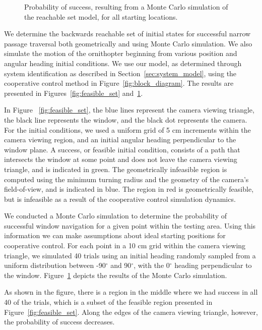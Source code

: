 \documentclass{aamas2013}
\begin{document}
\begin{figure}[tb]
\begin{minipage}[t]{0.47\linewidth}
\caption{Probability of success, resulting from a Monte Carlo simulation of
the reachable set model, for all starting locations.}
\label{fig:heat_map}
\end{minipage}
\end{figure}

We determine the backwards reachable set of initial states for successful
narrow passage traversal both geometrically and using Monte Carlo simulation.
We also simulate the motion of the ornithopter beginning from various position
and angular heading initial conditions. We use our model, as determined
through system identification as described in Section~\ref{sec:system_model},
using the cooperative control method in Figure~\ref{fig:block_diagram}. The
results are presented in Figures~\ref{fig:feasible_set}
and~\ref{fig:heat_map}.

In Figure ~\ref{fig:feasible_set}, 
the blue lines represent the camera viewing triangle, the black line represents the window, and the black 
dot represents the camera. For the initial conditions, we used a uniform
grid of 5 cm increments within the camera viewing region, and an initial
angular heading perpendicular to the window plane. A success, or feasible 
initial condition, consists of a path that intersects the window at some 
point and does not leave the camera viewing triangle, and is indicated in 
green. The geometrically infeasible region is computed using the minimum 
turning radius and the geometry of the camera's field-of-view, and is 
indicated in blue. The region in red is geometrically feasible, but is 
infeasible as a result of the cooperative control simulation dynamics.

We conducted a Monte Carlo simulation to determine the probability of
successful window navigation for a given point within the testing area. Using
this information we can make assumptions about ideal starting positions for
cooperative control. For each point in a 10 cm grid within the camera
viewing triangle, we simulated 40 trials using an initial heading randomly
sampled from a uniform distribution between -90$^{\circ}$ and 90$^{\circ}$,
with the 0$^{\circ}$ heading perpendicular to the window.
Figure~\ref{fig:heat_map} depicts the results of the Monte Carlo simulation.

As shown in the figure, there is a region in the middle where we had success
in all 40 of the trials, which is a subset of the feasible region presented in
Figure~\ref{fig:feasible_set}. Along the edges of the camera viewing triangle,
however, the probability of success decreases.
\end{document}
